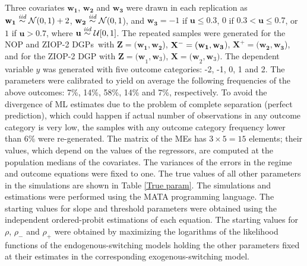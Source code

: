 \documentclass[letterpaper,fleqn,12pt]{article}
\begin{document}
\begin{onehalfspace}
Three covariates $\mathbf{w}_{\mathbf{1}}$, $\mathbf{w}_{\mathbf{2}}$ and $%
\mathbf{w}_{\mathbf{3}}$ were drawn in each replication as\noindent\ $%
\mathbf{w}_{\mathbf{1}}\overset{\emph{iid}}{\sim }\mathcal{N}(0,1)+2$, $%
\mathbf{w}_{\mathbf{2}}\overset{\emph{iid}}{\sim }\mathcal{N}(0,1$), and $%
\mathbf{w}_{\mathbf{3}}=-1$ if $\mathbf{u}\leq 0.3$, $0$ if $0.3<\mathbf{u}%
\leq 0.7$, or $1$ if $\mathbf{u}>0.7$, where $\mathbf{u}\overset{\emph{iid}}{%
\sim }\mathcal{U}[0,1]$. The repeated samples were generated for the NOP and
ZIOP-2 DGPs\textit{\ }with $\mathbf{Z=(w_{1}},\mathbf{w_{2}}$), $\mathbf{%
\mathbf{X}^{-}=(w_{1}},\mathbf{w_{3}}$), $\mathbf{\mathbf{X}^{+}=(w_{2}},%
\mathbf{w_{3}}$), and for the ZIOP-2 DGP with $\mathbf{Z=(w}_{1},\mathbf{w}%
_{3})$, $\mathbf{\mathbf{X}=(w}_{2},\mathbf{w}_{3})$. The dependent variable 
$y$ was generated with five outcome categories: -2, -1, 0, 1 and 2. The
parameters were calibrated to yield on average the following frequencies of
the above outcomes: 7\%, 14\%, 58\%, 14\% and 7\%, respectively. To avoid
the divergence of ML estimates due to the problem of complete separation
(perfect prediction), which could happen if actual number of observations in
any outcome category is very low, the samples with any outcome category
frequency lower than 6\% were re-generated. The matrix of the MEs has $%
3\times 5=15$ elements; their values, which depend on the values of the
regressors, are computed at the population medians of the covariates. The
variances of the errors in the regime and outcome equations were fixed to
one. The true values of all other parameters in the simulations are shown in
Table \ref{True param}. The simulations and estimations were performed using
the MATA programming language. The starting values for slope and threshold
parameters were obtained using the independent ordered-probit estimations of
each equation. The starting values for $\rho $, $\rho _{-}$ and $\rho _{+}$
were obtained by maximizing the logarithms of the likelihood functions of
the endogenous-switching models holding the other parameters fixed at their
estimates in the corresponding exogenous-switching model.


\begin{table}[H] \captionsetup{singlelinecheck = false, justification=justified}%


\end{table}
\end{onehalfspace}
\end{document}
